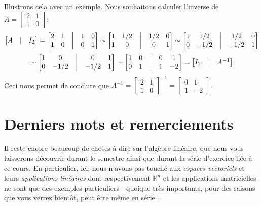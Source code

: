 \documentclass{article}
\newcommand{\R}{\mathbb{R}}
\begin{document}
\noindent Illustrons cela avec un exemple. Nous souhaitons calculer l'inverse de $A = \begin{bmatrix} 2 & 1 \\ 1 & 0\end{bmatrix}$: \\
$$\begin{bmatrix} A & | & I_2 \end{bmatrix} = 
\begin{bmatrix}
2 & 1 & \bigm| & 1 & 0 \\
1 & 0 & \bigm| & 0 & 1
\end{bmatrix} \sim 
\begin{bmatrix}
1 & 1/2 & \bigm| & 1/2 & 0 \\
1 & 0 & \bigm| & 0 & 1
\end{bmatrix} \sim
\begin{bmatrix}
1 & 1/2 & \bigm| & 1/2 & 0 \\
0 & -1/2 & \bigm| & -1/2 & 1
\end{bmatrix}$$ 
$$\sim
\begin{bmatrix}
1 & 0 & \bigm| & 0 & 1 \\
0 & -1/2 & \bigm| & -1/2 & 1
\end{bmatrix} \sim 
\begin{bmatrix}
1 & 0 & \bigm| & 0 & 1 \\
0 & 1 & \bigm| & 1 & -2
\end{bmatrix} = \begin{bmatrix} I_2 & | & A^{-1} \end{bmatrix}$$
Ceci nous permet de conclure que $A^{-1} = \begin{bmatrix} 2 & 1 \\ 1 & 0\end{bmatrix} ^{-1} = \begin{bmatrix} 0 & 1 \\ 1 & -2\end{bmatrix}$. \\

\section{Derniers mots et remerciements}
Il reste encore beaucoup de choses à dire sur l'algèbre linéaire, que nous vous laisserons découvrir durant le semestre ainsi que durant la série d'exercice liée à ce cours. En particulier, ici, nous n'avons pas touché aux \textit{espaces vectoriels} et leurs \textit{applications linéaires} dont respectivement $\R^n$ et les applications matricielles ne sont que des exemples particuliers - quoique très importants, pour des raisons que vous verrez bientôt, peut être même en série...\\
\end{document}

